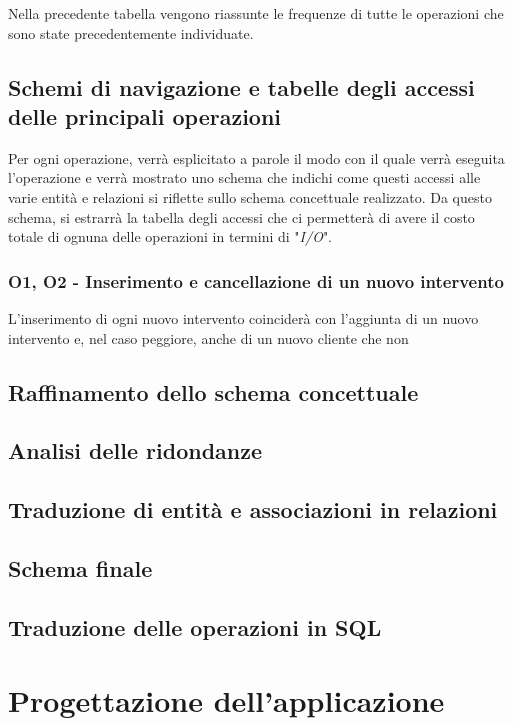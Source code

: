 \documentclass[a4paper, 12pt]{report}
\begin{document}
 Nella precedente tabella vengono riassunte le frequenze di tutte le operazioni che sono state precedentemente individuate.

\section{Schemi di navigazione e tabelle degli accessi delle principali operazioni}

Per ogni operazione, verrà esplicitato a parole il modo con il quale verrà eseguita l'operazione e verrà mostrato uno schema che indichi come questi
accessi alle varie entità e relazioni si riflette sullo schema concettuale realizzato. Da questo schema, si estrarrà la tabella degli accessi che ci
permetterà di avere il costo totale di ognuna delle operazioni in termini di "\textit{I/O}".

\subsection{O1, O2 - Inserimento e cancellazione di un nuovo intervento}

L'inserimento di ogni nuovo intervento coinciderà con l'aggiunta di un nuovo intervento e, nel caso peggiore, anche di un nuovo cliente che non 

\section{Raffinamento dello schema concettuale}

\section{Analisi delle ridondanze}

\section{Traduzione di entità e associazioni in relazioni}

\section{Schema finale}

\section{Traduzione delle operazioni in SQL}

\chapter{Progettazione dell'applicazione}
\end{document}
